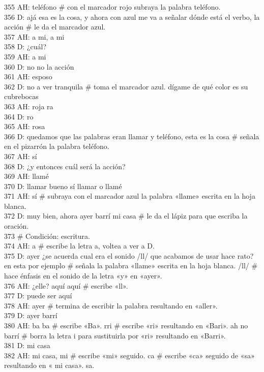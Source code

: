 355 AH: teléfono \# con el marcador rojo subraya la palabra teléfono.\\
356 D: ajá esa es la cosa, y ahora con azul me va a señalar dónde está el verbo, la acción \# le da el marcador azul.\\
357 AH: a mi, a mi\\
358 D: ¿cuál?\\
359 AH: a mi\\
360 D: no no la acción\\
361 AH: esposo\\
362 D: no a ver tranquila \# toma el marcador azul. dígame de qué color es su cubrebocas\\
363 AH: roja ra\\
364 D: ro\\
365 AH: rosa\\
366 D: quedamos que las palabras eran llamar y teléfono, esta es la cosa \# señala en el pizarrón la palabra teléfono.\\
367 AH: sí\\
368 D: ¿y entonces cuál será la acción?\\
369 AH: llamé\\
370 D: llamar bueno sí llamar o llamé\\
371 AH: sí \# subraya con el marcador azul la palabra «llame» escrita en la hoja blanca.\\
372 D: muy bien, ahora ayer barrí mi casa \# le da el lápiz para que escriba la oración.\\
373 \# Condición: escritura.\\
374 AH: a \# escribe la letra a, voltea a ver a D.\\
375 D: ayer ¿se acuerda cual era el sonido /ll/ que acabamos de usar hace rato? en esta por ejemplo \# señala la palabra «llame» escrita en la hoja blanca. /ll/ \# hace énfasis en el sonido de la letra «y» en «ayer».\\
376 AH: ¿elle? aquí aquí \# escribe «ll».\\
377 D: puede ser aquí\\
378 AH: ayer \# termina de escribir la palabra resultando en «aller».\\
379 D: ayer barrí\\
380 AH: ba ba \# escribe «Ba». rri \# escribe «ri» resultando en «Bari». ah no barrí \# borra la letra i para sustituirla por «ri» resultando en «Barri».\\
381 D: mi casa\\
382 AH: mi casa, mi \# escribe «mi» seguido. ca \# escribe «ca» seguido de «sa» resultando en « mi casa». sa.\\
